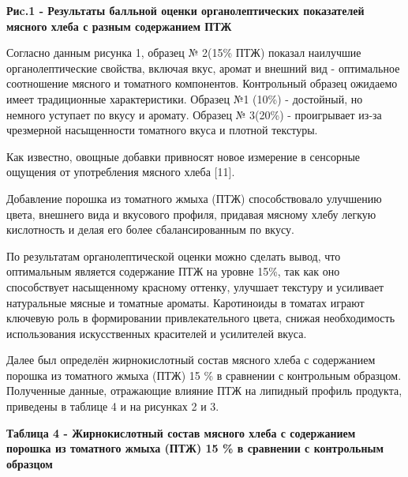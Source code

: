 {\bfseries Риc.1 - Результаты балльной оценки органолептических
показателей мясного хлеба с разным содержанием ПТЖ}

Согласно данным рисунка 1, образец № 2(15\% ПТЖ) показал наилучшие
органолептические свойства, включая вкус, аромат и внешний вид -
оптимальное соотношение мясного и томатного компонентов. Контрольный
образец ожидаемо имеет традиционные характеристики. Образец №1 (10\%) -
достойный, но немного уступает по вкусу и аромату. Образец № 3(20\%) -
проигрывает из-за чрезмерной насыщенности томатного вкуса и плотной
текстуры.

Как известно, овощные добавки привносят новое измерение в сенсорные
ощущения от употребления мясного хлеба {[}11{]}.

Добавление порошка из томатного жмыха (ПТЖ) способствовало улучшению
цвета, внешнего вида и вкусового профиля, придавая мясному хлебу легкую
кислотность и делая его более сбалансированным по вкусу.

По результатам органолептической оценки можно сделать вывод, что
оптимальным является содержание ПТЖ на уровне 15\%, так как оно
способствует насыщенному красному оттенку, улучшает текстуру и усиливает
натуральные мясные и томатные ароматы. Каротиноиды в томатах играют
ключевую роль в формировании привлекательного цвета, снижая
необходимость использования искусственных красителей и усилителей вкуса.

Далее был определён жирнокислотный состав мясного хлеба с содержанием
порошка из томатного жмыха (ПТЖ) 15 \% в сравнении с контрольным
образцом. Полученные данные, отражающие влияние ПТЖ на липидный профиль
продукта, приведены в таблице 4 и на рисунках 2 и 3.

{\bfseries Таблица 4 - Жирнокислотный состав мясного хлеба с содержанием
порошка из томатного жмыха (ПТЖ) 15 \% в сравнении с контрольным
образцом}

